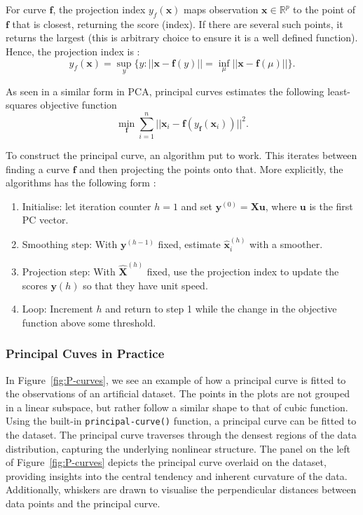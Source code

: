 \documentclass{article}\usepackage[]{graphicx}\usepackage[]{xcolor}
\numberwithin{equation}{section}
\begin{document}
\noindent For curve $\mathbf{f}$, the projection index $y_f(\mathbf{x})$ maps observation $\mathbf{x} \in \mathbb{R}^p$ to the point of $\mathbf{f}$ that is closest, returning the score (index). If there are several such points, it returns the largest (this is arbitrary choice to ensure it is a well defined function). Hence, the projection index is \cite{jolliffe2003principal}: 
\[
y_f(\mathbf{x}) = \sup\limits_{y}\{y: ||\mathbf{x}-\mathbf{f}(y)||= \inf\limits_{\mu}||\mathbf{x}-\mathbf{f}(\mu)||\}.
\]

\noindent As seen in a similar form in PCA, principal curves estimates the following least-squares objective function
\[
\min\limits_{\mathbf{f}}\sum_{i=1}^{n} ||\mathbf{x}_i - \mathbf{f}(y_{\mathbf{f}}(\mathbf{x}_i))||^2.
\]

\noindent To construct the principal curve, an algorithm put to work. This iterates between finding a curve $\mathbf{f}$ and then projecting the points onto that. More explicitly, the algorithms has the following form \cite{jolliffe2003principal}: 

\begin{enumerate}
  \item Initialise: let iteration counter $h = 1$ and set $\mathbf{y}^{(0)} = \mathbf{Xu}$, where $\mathbf{u}$ is the first PC vector. 
  \item Smoothing step: With $\mathbf{y}^{(h-1)}$ fixed, estimate $\mathbf{\hat{x}}_i^{(h)}$ with a smoother. 
  \item Projection step: With $\mathbf{\hat{X}}^{(h)}$ fixed, use the projection index to update the scores $\mathbf{y}{(h)}$ so that they have unit speed. 
  \item Loop: Increment $h$ and return to step 1 while the change in the objective function above some threshold.
\end{enumerate}

\subsubsection{Principal Cuves in Practice}

\noindent In Figure~\ref{fig:P-curves}, we see an example of how a principal curve is fitted to the observations of an artificial dataset. The points in the plots are not grouped in a linear subspace, but rather follow a similar shape to that of cubic function.\\

\noindent Using the built-in \texttt{principal-curve()} function, a principal curve can be fitted to the dataset. The principal curve traverses through the densest regions of the data distribution, capturing the underlying nonlinear structure. The panel on the left of Figure~\ref{fig:P-curves} depicts the principal curve overlaid on the dataset, providing insights into the central tendency and inherent curvature of the data. Additionally, whiskers are drawn to visualise the perpendicular distances between data points and the principal curve.
\end{document}
